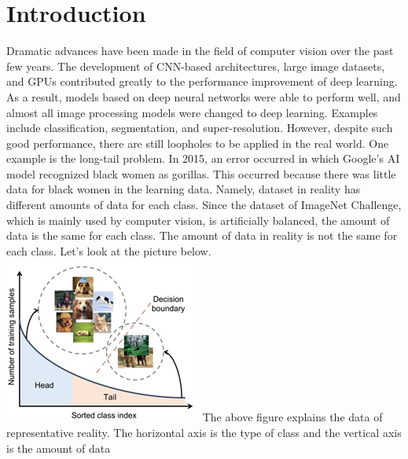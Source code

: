 \documentclass[extendedabs]{bmvc2k}
\begin{document}
\section{Introduction}
  \quad Dramatic advances have been made in the field of computer vision over the past few years. The development of CNN-based architectures, large image datasets,
  and GPUs contributed greatly to the performance improvement of deep learning. As a result, models based on deep neural networks were able to perform well,
  and almost all image processing models were changed to deep learning. Examples include classification, segmentation, and super-resolution. However, despite such good performance,
  there are still loopholes to be applied in the real world. One example is the long-tail problem.
  \newline
  \newline In 2015, an error occurred in which Google's AI model recognized black women as gorillas.\cite{article} This occurred because there was little data for black women in the learning data.
  Namely, dataset in reality has different amounts of data for each class. Since the dataset of ImageNet Challenge, which is mainly used by computer vision, is artificially balanced,
  the amount of data is the same for each class. The amount of data in reality is not the same for each class. Let's look at the picture below.
  \newline  \includegraphics[width=\linewidth]{images/00_project.PNG}
  The above figure explains the data of representative reality. The horizontal axis is the type of class and the vertical axis is the amount of data 
\end{document}
